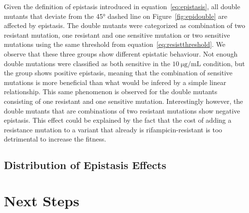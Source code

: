 \documentclass[12pt]{article}
\begin{document}
  Given the definition of epistasis introduced in
  equation~\eqref{eq:epistasis}, all double mutants that deviate from the
  45\si{\degree} dashed line on Figure~\ref{fig:epidouble} are affected by
  epistasis. The double mutants were categorized as combination of two
  resistant mutation, one resistant and one sensitive mutation or two sensitive
  mutations using the same threshold from equation~\eqref{eq:resistthreshold}.
  We observe that these three groups show different epistatic behaviour. Not
  enough double mutations were classified as both sensitive in the
  $\SI{10}{\micro\gram\per\milli\liter}$ condition, but the group shows
  positive epistasis, meaning that the combination of sensitive mutations is
  more beneficial than what would be infered by a simple linear relationship.
  This same phenomenon is observed for the double mutants consisting of one
  resistant and one sensitive mutation. Interestingly however, the double
  mutants that are combinations of two resistant mutations show negative
  epistasis. This effect could be explained by the fact that the cost of adding
  a resistance mutation to a variant that already is rifampicin-resistant is
  too detrimental to increase the fitness.

  \subsection{Distribution of Epistasis Effects}

  \section{Next Steps}



  \newpage

  
  
\end{document}

